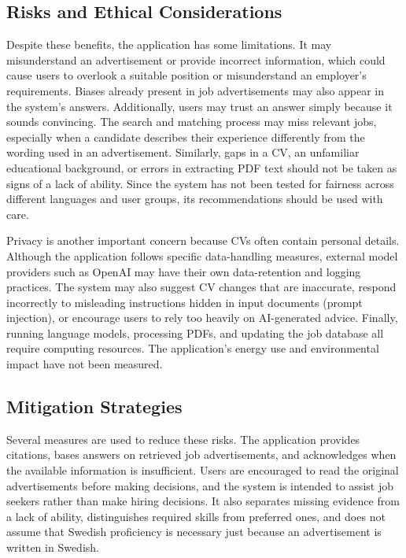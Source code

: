 \documentclass[a4paper,10pt]{article}
\begin{document}
\subsection{Risks and Ethical Considerations}
Despite these benefits, the application has some limitations. It may misunderstand an advertisement or provide incorrect information, which could cause users to overlook a suitable position or misunderstand an employer’s requirements. Biases already present in job advertisements may also appear in the system’s answers. Additionally, users may trust an answer simply because it sounds convincing. The search and matching process may miss relevant jobs, especially when a candidate describes their experience differently from the wording used in an advertisement. Similarly, gaps in a CV, an unfamiliar educational background, or errors in extracting PDF text should not be taken as signs of a lack of ability. Since the system has not been tested for fairness across different languages and user groups, its recommendations should be used with care.

Privacy is another important concern because CVs often contain personal details. Although the application follows specific data-handling measures, external model providers such as OpenAI may have their own data-retention and logging practices. The system may also suggest CV changes that are inaccurate, respond incorrectly to misleading instructions hidden in input documents (prompt injection), or encourage users to rely too heavily on AI-generated advice. Finally, running language models, processing PDFs, and updating the job database all require computing resources. The application’s energy use and environmental impact have not been measured.

\subsection{Mitigation Strategies}
Several measures are used to reduce these risks. The application provides citations, bases answers on retrieved job advertisements, and acknowledges when the available information is insufficient. Users are encouraged to read the original advertisements before making decisions, and the system is intended to assist job seekers rather than make hiring decisions. It also separates missing evidence from a lack of ability, distinguishes required skills from preferred ones, and does not assume that Swedish proficiency is necessary just because an advertisement is written in Swedish.
\end{document}
